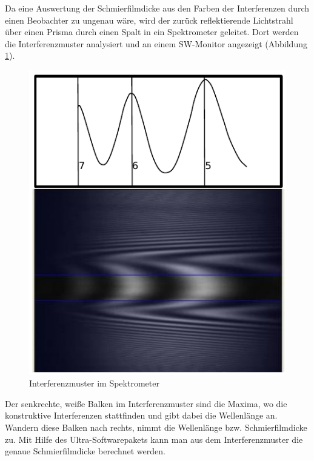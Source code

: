 Da eine Auswertung der Schmierfilmdicke aus den Farben der Interferenzen durch einen Beobachter zu ungenau wäre, wird der zurück reflektierende Lichtstrahl über einen Prisma durch einen Spalt in ein Spektrometer geleitet.
Dort werden die Interferenzmuster analysiert und an einem SW-Monitor angezeigt (Abbildung \ref{fig:ehl_interferenzmuster}).

\begin{figure}[htb]
    \centering
    \includegraphics[]{./images/interferenzsmuster.pdf}
    \caption{Interferenzmuster im Spektrometer \cite{ehl_broshure}}
    \label{fig:ehl_interferenzmuster}
\end{figure}
%
Der senkrechte, weiße Balken im Interferenzmuster sind die Maxima, wo die konstruktive Interferenzen stattfinden und gibt dabei die Wellenlänge an.
Wandern diese Balken nach rechts, nimmt die Wellenlänge bzw. Schmierfilmdicke zu.
Mit Hilfe des Ultra-Softwarepakets kann man aus dem Interferenzmuster die genaue Schmierfilmdicke berechnet werden.

